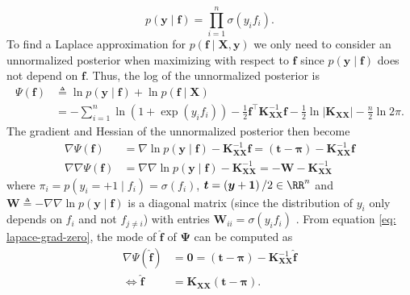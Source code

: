 \begin{equation*}
    p \left( \bm{y} \mid \bm{f} \right) = \prod_{i=1}^{n} \sigma \left( y_i f_i \right).
\end{equation*}
To find a Laplace approximation for $p \left( \bm{f} \mid \bm{X} , \bm{y} \right)$ we only need to consider an unnormalized posterior when maximizing with respect to $\bm{f}$ since $p \left( \bm{y} \mid \bm{f} \right)$ does not depend on $\bm{f}$. Thus, the log of the unnormalized posterior is
\begin{align*}
    \Psi \left( \bm{f} \right)
     & \triangleq \ln p \left( \bm{y} \mid \bm{f} \right) + \ln p \left( \bm{f} \mid \bm{X} \right)                                                                                                                                \\
     & = - \sum_{i=1}^{n} \ln \left( 1 + \exp \left( y_i f_i \right) \right) - \frac{1}{2} \bm{f}^{\intercal} \bm{K}_{\bm{X} \bm{X}}^{-1} \bm{f} - \frac{1}{2} \ln \left| \bm{K}_{\bm{X} \bm{X}} \right| - \frac{n}{2} \ln 2 \pi .
\end{align*}
The gradient and Hessian of the unnormalized posterior then become
\begin{align*}
    \nabla \Psi \left( \bm{f} \right)        & = \nabla \ln p \left( \bm{y} \mid \bm{f} \right) - \bm{K}_{\bm{X} \bm{X}}^{-1} \bm{f} = \left( \bm{t} - \bm{\pi} \right) - \bm{K}_{\bm{X} \bm{X}}^{-1} \bm{f} \\
    \nabla \nabla \Psi \left( \bm{f} \right) & = \nabla \nabla \ln p \left( \bm{y} \mid \bm{f} \right) - \bm{K}_{\bm{X} \bm{X}}^{-1} = - \bm{W} - \bm{K}_{\bm{X} \bm{X}}^{-1}
\end{align*}
where $\pi_i = p \left( y_i = +1 \mid f_i \right) = \sigma ( f_i )$, $\bm{t} = \left( \bm{y} + \bm{1} \right) / 2 \in \RR^{n}$ and $\bm{W} \triangleq - \nabla \nabla \ln p \left( \bm{y} \mid \bm{f} \right)$ is a diagonal matrix (since the distribution of $y_i$ only depends on $f_i$ and not $f_{j \neq i}$) with entries $\bm{W}_{ii} = \sigma \left( y_i f_i \right)$ \cite{BishopChristopherM2006Pram, RasmussenCarlEdward2006Gpfm}. From equation \ref{eq: lapace-grad-zero}, the mode of $\hat{\bm{f}}$ of $\bm{\Psi}$ can be computed as
\begin{align}
    \nabla \Psi \left( \hat{\bm{f}} \right) & = \bm{0} = \left( \bm{t} - \bm{\pi} \right) - \bm{K}_{\bm{X} \bm{X}}^{-1} \hat{\bm{f}} \nonumber \\
    \iff \hat{\bm{f}}                       & = \bm{K}_{\bm{X} \bm{X}} \left( \bm{t} - \bm{\pi} \right) \label{eq: expr-for-mode-lapace} .
\end{align}
